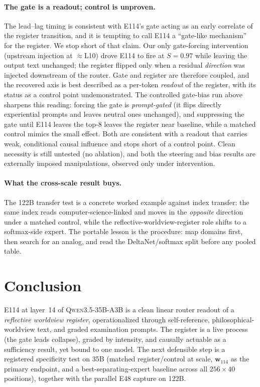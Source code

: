 \documentclass[10pt,a4paper,twocolumn]{article}
\newcommand{\Sel}{\textit{S}}
\newcommand{\wvec}{\mathbf{w}_{114}}
\begin{document}
\paragraph{The gate is a readout; control is unproven.}
The lead--lag timing is consistent with E114's gate acting as an early correlate
of the register transition, and it is tempting to call E114 a ``gate-like
mechanism'' for the register. We stop short of that claim. Our only gate-forcing
intervention (upstream injection at $\approx$L10) drove E114 to fire at
$\Sel{=}0.97$ while leaving the output text unchanged; the register flipped only
when a residual \emph{direction} was injected downstream of the router. Gate and
register are therefore coupled, and the recovered axis is best described as a
per-token \emph{readout} of the register, with its status as a control point
undemonstrated.
The controlled gate-bias run above sharpens this reading: forcing the gate is
\emph{prompt-gated} (it flips directly experiential prompts and leaves neutral ones
unchanged), and suppressing the gate until E114 leaves the top-8 leaves the
register near baseline, while a matched control mimics the small effect. Both are
consistent with a readout that carries weak, conditional causal influence and
stops short of a control point. Clean necessity is still untested (no ablation),
and both the steering and bias results are externally imposed manipulations,
observed only under intervention.

\paragraph{What the cross-scale result buys.}
The 122B transfer test is a concrete worked example against index transfer: the
same index reads computer-science-linked and moves in the \emph{opposite}
direction under a matched control, while the reflective-worldview-register role shifts to a
softmax-side expert. The portable lesson is the procedure: map domains first, then search for an
analog, and read the DeltaNet/softmax split before any pooled table.

\section{Conclusion}

E114 at layer~14 of \textsc{Qwen3.5-35B-A3B} is a clean linear router readout of a
\emph{reflective worldview register}, operationalized through self-reference,
philosophical-worldview text, and graded examination prompts. The register is a live
process (the gate leads collapse), graded by intensity, and causally actuable as a
sufficiency result, yet bound to one model. The next defensible step is a
registered specificity test on 35B (matched register/control at scale, $\wvec$ as
the primary endpoint, and a best-separating-expert baseline across all
$256{\times}40$ positions), together with the parallel E48 capture on 122B.
\end{document}
